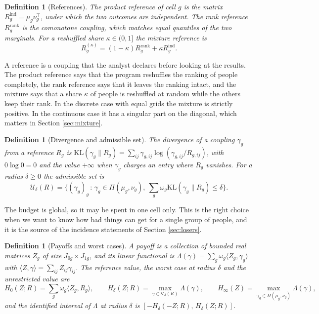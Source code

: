 \documentclass[11pt,a4paper]{article}
\theoremstyle{notesplain}
\theoremstyle{notesupright}
\newtheorem{definition}[theorem]{Definition}
\numberwithin{equation}{section}
\newcommand{\KL}{\mathrm{KL}}
\begin{document}
\begin{definition}[References]
\label{def:references}
The product reference of cell $g$ is the matrix $R^{\mathrm{ind}}_g=\mu_g\nu_g^\top$, under which the two outcomes are independent. The rank reference $R^{\mathrm{rank}}_g$ is the comonotone coupling, which matches equal quantiles of the two marginals. For a reshuffled share $\kappa\in(0,1]$ the mixture reference is
\begin{equation}
R^{(\kappa)}_g=(1-\kappa)R^{\mathrm{rank}}_g+\kappa R^{\mathrm{ind}}_g.
\end{equation}
\end{definition}

A reference is a coupling that the analyst declares before looking at the results. The product reference says that the program reshuffles the ranking of people completely, the rank reference says that it leaves the ranking intact, and the mixture says that a share $\kappa$ of people is reshuffled at random while the others keep their rank. In the discrete case with equal grids the mixture is strictly positive. In the continuous case it has a singular part on the diagonal, which matters in Section \ref{sec:mixture}.

\begin{definition}[Divergence and admissible set]
\label{def:ball}
The divergence of a coupling $\gamma_g$ from a reference $R_g$ is $\KL(\gamma_g\|R_g)=\sum_{ij}\gamma_{g,ij}\log(\gamma_{g,ij}/R_{g,ij})$, with $0\log0=0$ and the value $+\infty$ when $\gamma_g$ charges an entry where $R_g$ vanishes. For a radius $\delta\ge0$ the admissible set is
\begin{equation}
\mathcal U_\delta(R)=\Big\{(\gamma_g)_{g}\,:\,\gamma_g\in\Pi(\mu_g,\nu_g),\ \sum_g\omega_g\KL(\gamma_g\|R_g)\le\delta\Big\}.
\label{eq:ball}
\end{equation}
\end{definition}

The budget is global, so it may be spent in one cell only. This is the right choice when we want to know how bad things can get for a single group of people, and it is the source of the incidence statements of Section \ref{sec:losers}.

\begin{definition}[Payoffs and worst cases]
\label{def:worst}
A payoff is a collection of bounded real matrices $Z_g$ of size $J_{0g}\times J_{1g}$, and its linear functional is $\Lambda(\gamma)=\sum_g\omega_g\langle Z_g,\gamma_g\rangle$ with $\langle Z,\gamma\rangle=\sum_{ij}Z_{ij}\gamma_{ij}$. The reference value, the worst case at radius $\delta$ and the unrestricted value are
\begin{equation}
H_0(Z;R)=\sum_g\omega_g\langle Z_g,R_g\rangle,\qquad
H_\delta(Z;R)=\max_{\gamma\in\mathcal U_\delta(R)}\Lambda(\gamma),\qquad
H_\infty(Z)=\max_{\gamma_g\in\Pi(\mu_g,\nu_g)}\Lambda(\gamma),
\label{eq:worst}
\end{equation}
and the identified interval of $\Lambda$ at radius $\delta$ is $[-H_\delta(-Z;R),\,H_\delta(Z;R)]$.
\end{definition}
\end{document}
